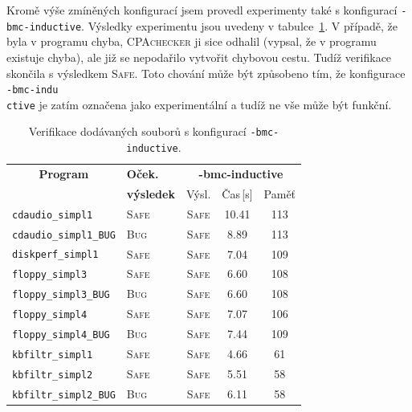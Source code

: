 \documentclass[a4paper,12pt]{article}
\begin{document}
Kromě výše zmíněných konfigurací jsem provedl experimenty také s konfigurací \texttt{-bmc-inductive}. Výsledky
experimentu jsou uvedeny v tabulce~\ref{tab:res2}. V případě, že byla v programu chyba, \textsc{CPAchecker}
ji sice odhalil (vypsal, že v programu existuje chyba), ale již se nepodařilo vytvořit chybovou cestu. Tudíž verifikace skončila s výsledkem \textsc{Safe}.
Toto chování může být způsobeno tím, že konfigurace \texttt{-bmc-indu\\ctive} je zatím označena jako experimentální a tudíž ne vše
může být funkční.


\begin{table}[h!]
\renewcommand{\arraystretch}{1.2}
\begin{center}
  \begin{tabular}{| l | p{2cm} | c  c  c |}
    \hline
   \multicolumn{1}{|c|}{\bf Program} & {\small\bf Oček.} & \multicolumn{3}{c|}{\small\bf -bmc-inductive}  \\
     & {\small\bf výsledek}  & Výsl. & Čas\,[s] & Paměť \\
    \hline\hline
    {\small \texttt{cdaudio\_simpl1}} & \textsc{Safe} & \textsc{Safe} & 10.41 & 113 \\\hline
    {\small \texttt{cdaudio\_simpl1\_BUG}} & \textsc{Bug} & \textsc{Safe} & 8.89 & 113 \\ \hline
    {\small \texttt{diskperf\_simpl1}} & \textsc{Safe} & \textsc{Safe} & 7.04 & 109 \\ \hline
    {\small \texttt{floppy\_simpl3}} & \textsc{Safe}  & \textsc{Safe} & 6.60 & 108 \\ \hline
    {\small \texttt{floppy\_simpl3\_BUG}} & \textsc{Bug} & \textsc{Safe} & 6.60 & 108 \\ \hline
    {\small \texttt{floppy\_simpl4}} & \textsc{Safe} & \textsc{Safe} & 7.07 & 106 \\ \hline
    {\small \texttt{floppy\_simpl4\_BUG}} & \textsc{Bug} & \textsc{Safe} & 7.44 & 109 \\ \hline
    {\small \texttt{kbfiltr\_simpl1}} & \textsc{Safe} & \textsc{Safe} & 4.66 & 61 \\ \hline
    {\small \texttt{kbfiltr\_simpl2}} & \textsc{Safe} & \textsc{Safe} & 5.51 & 58 \\ \hline
    {\small \texttt{kbfiltr\_simpl2\_BUG}} & \textsc{Bug} & \textsc{Safe} & 6.11 & 58 \\
    \hline
  \end{tabular}
\end{center}
\caption{Verifikace dodávaných souborů s konfigurací \texttt{-bmc-inductive}.}
\label{tab:res2}
\end{table}
\end{document}
